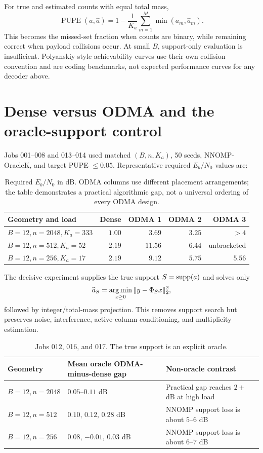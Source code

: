 \documentclass[11pt]{article}
\begin{document}
For true and estimated counts with equal total mass,
\[
 \operatorname{PUPE}(a,\widehat a)=1-\frac{1}{K_a}\sum_{m=1}^{M}\min(a_m,\widehat a_m).
\]
This becomes the missed-set fraction when counts are binary, while remaining correct when payload collisions occur.
At small $B$, support-only evaluation is insufficient. Polyanskiy-style achievability curves use their own collision
convention and are coding benchmarks, not expected performance curves for any decoder above.

\section{Dense versus ODMA and the oracle-support control}

Jobs 001--008 and 013--014 used matched $(B,n,K_a)$, 50 seeds, NNOMP-OracleK, and target PUPE $\le0.05$. Representative
required $E_b/N_0$ values are:
\begin{table}[ht]
\centering
\small
\begin{tabular}{@{}lrrrr@{}}
\toprule
Geometry and load & Dense & ODMA 1 & ODMA 2 & ODMA 3 \\
\midrule
$B=12,n=2048,K_a=333$ & $1.00$ & $3.69$ & $3.25$ & $>4$ \\
$B=12,n=512,K_a=52$ & $2.19$ & $11.56$ & $6.44$ & unbracketed \\
$B=12,n=256,K_a=17$ & $2.19$ & $9.12$ & $5.75$ & $5.56$ \\
\bottomrule
\end{tabular}
\caption{Required $E_b/N_0$ in dB. ODMA columns use different placement arrangements; the table demonstrates a
practical algorithmic gap, not a universal ordering of every ODMA design.}
\end{table}

The decisive experiment supplies the true support $S=\operatorname{supp}(a)$ and solves only
\[
 \widehat a_S=\operatorname*{arg\,min}_{x\ge0}\|y-\Phi_Sx\|_2^2,
\]
followed by integer/total-mass projection. This removes support search but preserves noise, interference, active-column
conditioning, and multiplicity estimation.

\begin{table}[ht]
\centering
\small
\begin{tabularx}{\textwidth}{@{}lYY@{}}
\toprule
Geometry & Mean oracle ODMA-minus-dense gap & Non-oracle contrast \\
\midrule
$B=12,n=2048$ & $0.05$--$0.11$ dB & Practical gap reaches $2+$ dB at high load \\
$B=12,n=512$ & $0.10$, $0.12$, $0.28$ dB & NNOMP support loss is about $5$--$6$ dB \\
$B=12,n=256$ & $0.08$, $-0.01$, $0.03$ dB & NNOMP support loss is about $6$--$7$ dB \\
\bottomrule
\end{tabularx}
\caption{Jobs 012, 016, and 017. The true support is an explicit oracle.}
\end{table}
\end{document}
